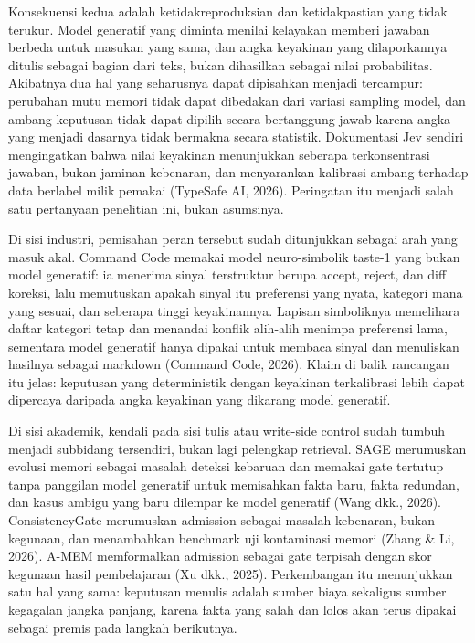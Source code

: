 \documentclass[
]{article}
\begin{document}
Konsekuensi kedua adalah ketidakreproduksian dan ketidakpastian yang
tidak terukur. Model generatif yang diminta menilai kelayakan memberi
jawaban berbeda untuk masukan yang sama, dan angka keyakinan yang
dilaporkannya ditulis sebagai bagian dari teks, bukan dihasilkan sebagai
nilai probabilitas. Akibatnya dua hal yang seharusnya dapat dipisahkan
menjadi tercampur: perubahan mutu memori tidak dapat dibedakan dari
variasi sampling model, dan ambang keputusan tidak dapat dipilih secara
bertanggung jawab karena angka yang menjadi dasarnya tidak bermakna
secara statistik. Dokumentasi Jev sendiri mengingatkan bahwa nilai
keyakinan menunjukkan seberapa terkonsentrasi jawaban, bukan jaminan
kebenaran, dan menyarankan kalibrasi ambang terhadap data berlabel milik
pemakai (TypeSafe AI, 2026). Peringatan itu menjadi salah satu
pertanyaan penelitian ini, bukan asumsinya.

Di sisi industri, pemisahan peran tersebut sudah ditunjukkan sebagai
arah yang masuk akal. Command Code memakai model neuro-simbolik taste-1
yang bukan model generatif: ia menerima sinyal terstruktur berupa
accept, reject, dan diff koreksi, lalu memutuskan apakah sinyal itu
preferensi yang nyata, kategori mana yang sesuai, dan seberapa tinggi
keyakinannya. Lapisan simboliknya memelihara daftar kategori tetap dan
menandai konflik alih-alih menimpa preferensi lama, sementara model
generatif hanya dipakai untuk membaca sinyal dan menuliskan hasilnya
sebagai markdown (Command Code, 2026). Klaim di balik rancangan itu
jelas: keputusan yang deterministik dengan keyakinan terkalibrasi lebih
dapat dipercaya daripada angka keyakinan yang dikarang model generatif.

Di sisi akademik, kendali pada sisi tulis atau write-side control sudah
tumbuh menjadi subbidang tersendiri, bukan lagi pelengkap retrieval.
SAGE merumuskan evolusi memori sebagai masalah deteksi kebaruan dan
memakai gate tertutup tanpa panggilan model generatif untuk memisahkan
fakta baru, fakta redundan, dan kasus ambigu yang baru dilempar ke model
generatif (Wang dkk., 2026). ConsistencyGate merumuskan admission
sebagai masalah kebenaran, bukan kegunaan, dan menambahkan benchmark uji
kontaminasi memori (Zhang \& Li, 2026). A-MEM memformalkan admission
sebagai gate terpisah dengan skor kegunaan hasil pembelajaran (Xu dkk.,
2025). Perkembangan itu menunjukkan satu hal yang sama: keputusan
menulis adalah sumber biaya sekaligus sumber kegagalan jangka panjang,
karena fakta yang salah dan lolos akan terus dipakai sebagai premis pada
langkah berikutnya.
\end{document}
